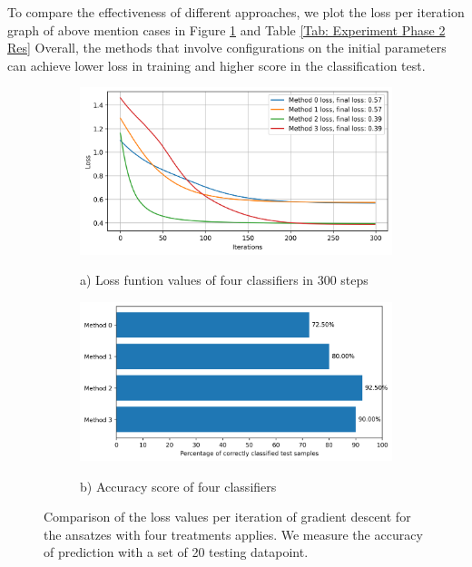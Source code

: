 To compare the effectiveness of different approaches, we plot the loss per iteration graph of above mention cases in Figure \ref{Fig: Plot Loss and Accuracy} and Table \ref{Tab: Experiment Phase 2 Res}
Overall, the methods that involve configurations on the initial parameters can achieve lower loss in training and higher score in the classification test.

\begin{figure}
    \begin{subfigure}{\textwidth}
        \includegraphics[width=\textwidth]{Artefact/Appendices/loss.png}
        \centerline{a) Loss funtion values of four classifiers in 300 steps}
    \end{subfigure}
    \begin{subfigure}{\textwidth}
        \includegraphics[width=\textwidth]{Artefact/Appendices/accuracy.png}
        \centerline{b) Accuracy score of four classifiers}
    \end{subfigure}

    \caption{
        Comparison of the loss values per iteration of gradient descent for the ansatzes with four treatments applies.
        We measure the accuracy of prediction with a set of 20 testing datapoint.
    }
    \label{Fig: Plot Loss and Accuracy}
\end{figure}
